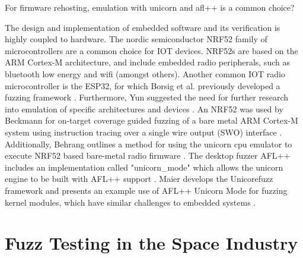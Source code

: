 \documentclass[../report.tex]{subfiles}
\begin{document}
For firmware rehosting, emulation with unicorn and afl++ is a common choice?



The design and implementation of embedded software and its verification is
highly coupled to hardware. The nordic semiconductor NRF52 family of
microcontrollers are a common choice for IOT devices. NRF52s are based on the
ARM Cortex-M architecture, and include embedded radio peripherals, such as
bluetooth low energy and wifi (amongst others). Another common IOT radio
microcontroller is the ESP32, for which Borsig et al. previously developed a
fuzzing framework \citep{Borsig_2020}. Furthermore, Yun suggested the need for
further research into emulation of specific architectures and devices
\citep{Yun_2022}. An NRF52 was used by Beckmann for on-target coverage guided
fuzzing of a bare metal ARM Cortex-M system using instruction tracing over a
single wire output (SWO) interface \citep{Beckmann_2023}. Additionally, Behrang
outlines a method for using the unicorn cpu emulator to execute NRF52 based
bare-metal radio firmware \citep{Behrang_2023}. The desktop fuzzer AFL++
includes an implementation called "unicorn\_mode" which allows the unicorn
engine to be built with AFL++ support \citep{UnicornMode}. Maier develops the
Unicorefuzz framework and presents an example use of AFL++ Unicorn Mode for
fuzzing kernel modules, which have similar challenges to embedded systems
\citep{Maier_2019}.

\section{Fuzz Testing in the Space Industry}



\end{document}
